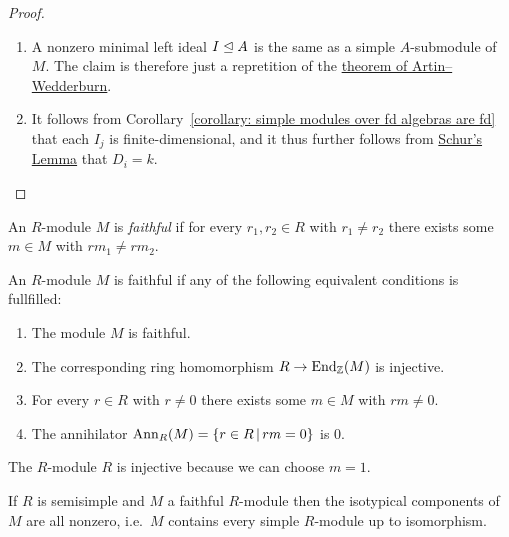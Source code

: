 \begin{proof}
  \leavevmode
  \begin{enumerate}
    \item
      A nonzero minimal left ideal $I \trianglelefteq A$ is the same as a simple $A$-submodule of $M$.
      The claim is therefore just a repretition of the \hyperref[theorem: artin wedderburn theorem]{theorem of Artin--Wedderburn}.
    \item
      It follows from Corollary~\ref{corollary: simple modules over fd algebras are fd} that each $I_j$ is finite-dimensional, and it thus further follows from \hyperref[proposition: schurs lemma for modules]{Schur’s Lemma} that $D_i = k$.
    \qedhere
  \end{enumerate}
\end{proof}


\begin{definition}
  An $R$-module $M$ is \emph{faithful} if for every $r_1, r_2 \in R$ with $r_1 \neq r_2$ there exists some $m \in M$ with $r m_1 \neq r m_2$.
\end{definition}


\begin{remark}
  An $R$-module $M$ is faithful if any of the following equivalent conditions is fullfilled:
  \begin{enumerate}
    \item
      The module $M$ is faithful.
    \item
      The corresponding ring homomorphism $R \to \operatorname{End}_{\mathbb{Z}}(M)$ is injective.
    \item
      For every $r \in R$ with $r \neq 0$ there exists some $m \in M$ with $rm \neq 0$.
    \item
      The annihilator $\Ann_R(M) = \{r \in R \suchthat rm = 0\}$ is $0$.
  \end{enumerate}
\end{remark}


\begin{example}
  The $R$-module $R$ is injective because we can choose $m = 1$.
\end{example}


\begin{corollary}
  If $R$ is semisimple and $M$ a faithful $R$-module then the isotypical components of $M$ are all nonzero, i.e.\ $M$ contains every simple $R$-module up to isomorphism.
\end{corollary}


